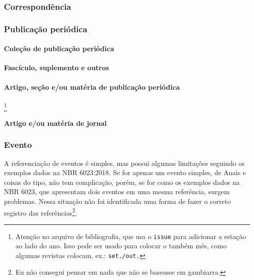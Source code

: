 

\subsubsection{Correspondência}

\subsubsection{Publicação periódica}
\paragraph{Coleção de publicação periódica}


\paragraph{Fascículo, suplemento e outros}


\paragraph{Artigo, seção e/ou matéria de publicação periódica}
\footnote{Atenção no arquivo de bibliografia, que usa o \texttt{issue} para adicionar a estação ao lado do ano. Isso pode ser usado para colocar o também mês, como algumas revistas colocam, ex.: \texttt{set./out.}}



\paragraph{Artigo e/ou matéria de jornal}


\subsubsection{Evento}
A referenciação de eventos é simples, mas possui algumas limitações seguindo os exemplos dados na NBR 6023:2018. Se for apenas um evento simples, de Anais e coisas do tipo, não tem complicação, porém, se for como os exemplos dados na NBR 6023, que apresentam dois eventos em uma mesma referência, surgem problemas. Nessa situação não foi identificada uma forma de fazer o correto registro das referências\footnote{Eu não consegui pensar em nada que não se baseasse em gambiarra.}.

